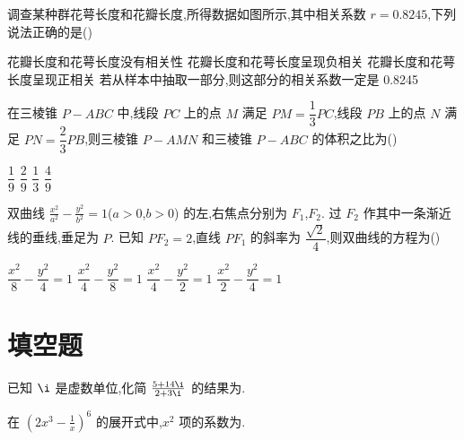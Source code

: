 \begin{problem}
调查某种群花萼长度和花瓣长度,所得数据如图所示,其中相关系数 \(r=0.8245\),下列说法正确的是(\quad)


\choices
    {花瓣长度和花萼长度没有相关性}
    {花瓣长度和花萼长度呈现负相关}
    {花瓣长度和花萼长度呈现正相关}
    {若从样本中抽取一部分,则这部分的相关系数一定是 0.8245}
\end{problem}

\begin{problem}
在三棱锥 \(P-ABC\) 中,线段 \(PC\) 上的点 \(M\) 满足 \(PM=\dfrac{1}{3}PC\),线段 \(PB\) 上的点 \(N\) 满足 \(PN=\dfrac{2}{3}PB\),则三棱锥 \(P-AMN\) 和三棱锥 \(P-ABC\) 的体积之比为(\quad)

\choices
    {\(\dfrac{1}{9}\)}
    {\(\dfrac{2}{9}\)}
    {\(\dfrac{1}{3}\)}
    {\(\dfrac{4}{9}\)}
\end{problem}

\begin{problem}
双曲线 \(\frac{x^2}{a^2}-\frac{y^2}{b^2}=1\)(\(a>0\),\(b>0\)) 的左,右焦点分别为 \(F_1\),\(F_2\). 过 \(F_2\) 作其中一条渐近线的垂线,垂足为 \(P\). 已知 \(PF_2=2\),直线 \(PF_1\) 的斜率为 \(\dfrac{\sqrt{2}}{4}\),则双曲线的方程为(\quad)


\choices
    {\(\dfrac{x^2}{8}-\dfrac{y^2}{4}=1\)}
    {\(\dfrac{x^2}{4}-\dfrac{y^2}{8}=1\)}
    {\(\dfrac{x^2}{4}-\dfrac{y^2}{2}=1\)}
    {\(\dfrac{x^2}{2}-\dfrac{y^2}{4}=1\)}
\end{problem}

\section{填空题}

\begin{problem}
已知 \(\i\) 是虚数单位,化简 \(\frac{5+14\i}{2+3\i}\) 的结果为\fillinblank{}.
\end{problem}

\begin{problem}
在 \(\left( 2x^3-\frac{1}{x} \right)^6\) 的展开式中,\(x^2\) 项的系数为\fillinblank{}.
\end{problem}

